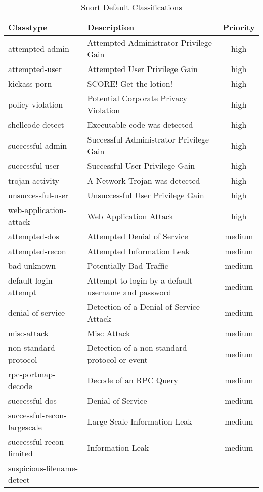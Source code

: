 \documentclass[english]{report}
\begin{document}
\begin{center}
\begin{longtable}[h]{|p{2in}|p{2.5in}|c|}
\caption{Snort Default Classifications}
\label{Snort Default Classifications} \\
\hline 
Classtype & Description & Priority \\
\hline
\hline 
attempted-admin&
Attempted Administrator Privilege Gain & high \\
\hline 
attempted-user&
Attempted User Privilege Gain & high\\
\hline
kickass-porn&
SCORE! Get the lotion! & high\\
\hline 
policy-violation&
Potential Corporate Privacy Violation & high\\
\hline
shellcode-detect&
Executable code was detected & high\\
\hline 
successful-admin&
Successful Administrator Privilege Gain & high\\
\hline 
successful-user&
Successful User Privilege Gain & high\\
\hline 
trojan-activity&
A Network Trojan was detected & high\\
\hline 
unsuccessful-user&
Unsuccessful User Privilege Gain & high\\
\hline 
web-application-attack&
Web Application Attack & high\\
\hline
attempted-dos&
Attempted Denial of Service & medium\\
\hline 
attempted-recon&
Attempted Information Leak & medium\\
\hline 
bad-unknown&
Potentially Bad Traffic & medium\\
\hline
default-login-attempt&
Attempt to login by a default username and password & medium\\
\hline 
denial-of-service&
Detection of a Denial of Service Attack & medium\\
\hline 
misc-attack&
Misc Attack & medium\\
\hline 
non-standard-protocol&
Detection of a non-standard protocol or event & medium\\
\hline 
rpc-portmap-decode&
Decode of an RPC Query & medium\\
\hline 
successful-dos&
Denial of Service & medium\\
\hline 
successful-recon-largescale&
Large Scale Information Leak & medium\\
\hline 
successful-recon-limited&
Information Leak & medium\\
\hline 
suspicious-filename-detect&

\end{longtable}
\end{center}
\end{document}
